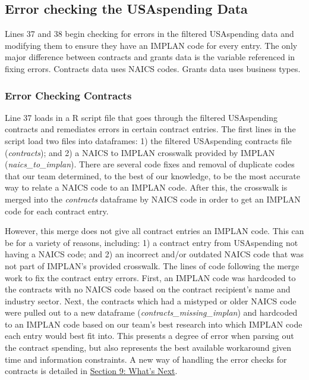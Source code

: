 \documentclass[
]{book}
\begin{document}
\hypertarget{error-check}{%
\subsection{Error checking the USAspending Data}\label{error-check}}

Lines 37 and 38 begin checking for errors in the filtered USAspending data and modifying them to ensure they have an IMPLAN code for every entry. The only major difference between contracts and grants data is the variable referenced in fixing errors. Contracts data uses NAICS codes. Grants data uses business types.

\hypertarget{error-contracts}{%
\subsubsection{Error Checking Contracts}\label{error-contracts}}

Line 37 loads in a R script file that goes through the filtered USAspending contracts and remediates errors in certain contract entries. The first lines in the script load two files into dataframes: 1) the filtered USAspending contracts file (\emph{contracts}); and 2) a NAICS to IMPLAN crosswalk provided by IMPLAN (\emph{naics\_to\_implan}). There are several code fixes and removal of duplicate codes that our team determined, to the best of our knowledge, to be the most accurate way to relate a NAICS code to an IMPLAN code. After this, the crosswalk is merged into the \emph{contracts} dataframe by NAICS code in order to get an IMPLAN code for each contract entry.

However, this merge does not give all contract entries an IMPLAN code. This can be for a variety of reasons, including: 1) a contract entry from USAspending not having a NAICS code; and 2) an incorrect and/or outdated NAICS code that was not part of IMPLAN's provided crosswalk. The lines of code following the merge work to fix the contract entry errors. First, an IMPLAN code was hardcoded to the contracts with no NAICS code based on the contract recipient's name and industry sector. Next, the contracts which had a mistyped or older NAICS code were pulled out to a new dataframe (\emph{contracts\_missing\_implan}) and hardcoded to an IMPLAN code based on our team's best research into which IMPLAN code each entry would best fit into. This presents a degree of error when parsing out the contract spending, but also represents the best available workaround given time and information constraints. A new way of handling the error checks for contracts is detailed in \href{next}{Section 9: What's Next}.
\end{document}
